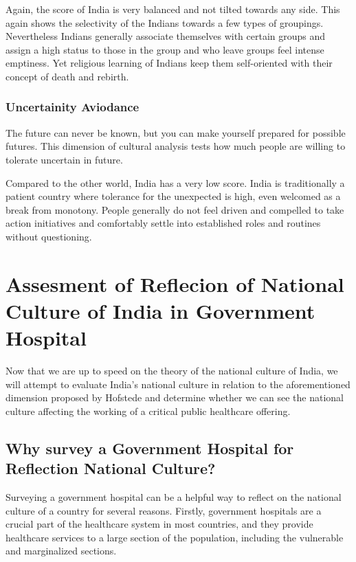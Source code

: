 \documentclass[12pt]{article}
\begin{document}
Again, the score of India is very balanced and not tilted towards any side. This again shows the selectivity of the Indians towards a few types of groupings. Nevertheless Indians generally associate themselves with certain groups and assign a high status to those in the group and who leave groups feel intense emptiness. Yet religious learning of Indians keep them self-oriented with their concept of death and rebirth.

\subsubsection{Uncertainity Aviodance}

The future can never be known, but you can make yourself prepared for possible futures. This dimension of cultural analysis tests how much people are willing to tolerate uncertain in future.

Compared to the other world, India has a very low score. India is traditionally a patient country where tolerance for the unexpected is high, even welcomed as a break from monotony. People generally do not feel driven and compelled to take action initiatives and comfortably settle into established roles and routines without questioning.

\section{Assesment of Reflecion of National Culture of India in Government Hospital}

Now that we are up to speed on the theory of the national culture of India, we will attempt to evaluate India's national culture in relation to the aforementioned dimension proposed by Hofstede and determine whether we can see the national culture affecting the working of a critical public healthcare offering.

\subsection{Why survey a Government Hospital for Reflection National Culture?}

Surveying a government hospital can be a helpful way to reflect on the national culture of a country for several reasons. Firstly, government hospitals are a crucial part of the healthcare system in most countries, and they provide healthcare services to a large section of the population, including the vulnerable and marginalized sections.
\end{document}

